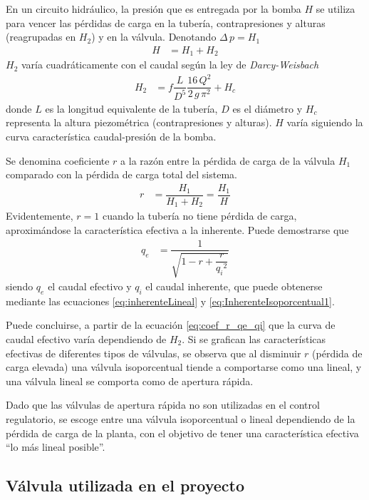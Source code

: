 En un circuito hidráulico, la presión que es entregada por la bomba $H$ se 
utiliza para vencer las pérdidas de carga en la tubería, contrapresiones y 
alturas (reagrupadas en $H_2$) y en la válvula.
Denotando $\Delta \,p = H_1$
\begin{align}
 H &= H_1 + H_2
\end{align}
$H_2$ varía cuadráticamente con el caudal según la ley de \emph{Darcy-Weisbach}
\cite{bib:Franzini}
\begin{align}
 H_2  &= f \dfrac{L}{D^5}\dfrac{16\,Q^2}{2\,g\,\pi^2} + H_c
\end{align}
donde $L$ es la longitud equivalente de la tubería, $D$ es el diámetro y $H_c$
representa la altura piezométrica (contrapresiones y alturas).
$H$ varía siguiendo la curva característica caudal-presión de la bomba.

Se denomina coeficiente $r$ a la razón entre la pérdida de carga de la válvula
$H_1$ comparado con la pérdida de carga total del sistema.
\begin{align}
 r &= \dfrac{H_1}{H_1+H_2} = \dfrac{H_1}{H}
\end{align}
Evidentemente, $r = 1$ cuando la tubería no tiene pérdida de carga,
aproximándose la característica efectiva a la inherente.
Puede demostrarse \cite{bib:Creus} que
\begin{align}
 q_e &= \dfrac{1}{\sqrt{1-r+\dfrac{r}{{q_i}^2}}}
 \label{eq:coef_r_qe_qi}
\end{align}
siendo $q_e$ el caudal efectivo y $q_i$ el caudal inherente, que puede
obtenerse mediante las ecuaciones \eqref{eq:inherenteLineal} y
\eqref{eq:InherenteIsoporcentual1}.

Puede concluirse, a partir de la ecuación \eqref{eq:coef_r_qe_qi} que la curva
de caudal efectivo varía dependiendo de $H_2$.
Si se grafican las características efectivas de diferentes tipos de válvulas,
se observa que al disminuir $r$ (pérdida de carga elevada) una válvula
isoporcentual tiende a comportarse como una lineal,
y una válvula lineal se comporta como de apertura rápida.


Dado que las válvulas de apertura rápida no son utilizadas en el control
regulatorio, se escoge entre una válvula isoporcentual o lineal dependiendo de
la pérdida de carga de la planta, con el objetivo de tener una característica
efectiva ``lo más lineal posible''.


\subsection{Válvula utilizada en el proyecto}

